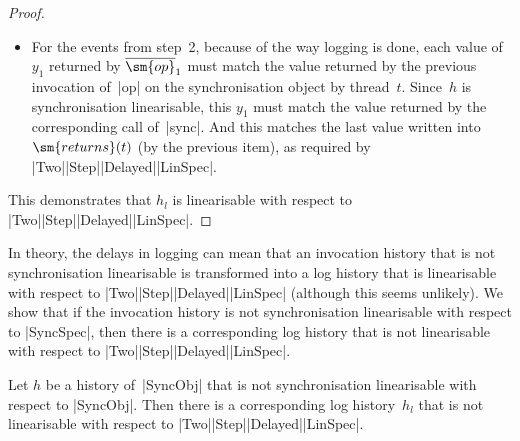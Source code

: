 \begin{proof}
\begin{itemize}
\item For the events from step~2, because of the way logging is done, each
  value of~$y_1$ returned by $\overline{\sm{op}}_1$ must match the value
  returned by the previous invocation of~|op| on the synchronisation object
  by thread~$t$.  Since~$h$ is synchronisation linearisable, this $y_1$ must
  match the value returned by the corresponding call of~|sync|.  And this
  matches the last value written into $\sm{returns}(t)$ (by the previous
  item), as required by |Two|\-|Step|\-|Delayed|\-|LinSpec|.
\end{itemize}
%
This demonstrates that $h_l$ is linearisable with respect to
|Two|\-|Step|\-|Delayed|\-|LinSpec|.
\end{proof}


In theory, the delays in logging can mean that an invocation history that is
not synchronisation linearisable is transformed into a log history that is
linearisable with respect to |Two|\-|Step|\-|Delayed|\-|LinSpec| (although
this seems unlikely).  
%
We show that if the invocation history is not synchronisation linearisable
with respect to |SyncSpec|,
then there is a corresponding log history that is not linearisable with
respect to |Two|\-|Step|\-|Delayed|\-|LinSpec|.
%
\begin{prop}
\label{prop:TwoStepDelayedLinSpec-complete}
Let $h$ be a history of~|SyncObj| that is not synchronisation linearisable
with respect to |SyncObj|.  Then there is a corresponding log history~$h_l$
that is not linearisable with respect to |Two|\-|Step|\-|Delayed|\-|LinSpec|.
\end{prop}


